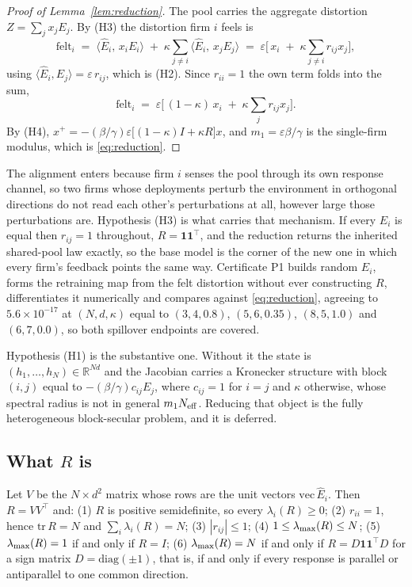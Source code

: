 \begin{proof}[Proof of Lemma~\ref{lem:reduction}]
The pool carries the aggregate distortion $Z = \sum_j x_j E_j$. By (H3) the distortion firm $i$ feels is
\[
  \mathrm{felt}_i \;=\; \langle \hat{E}_i,\, x_i E_i\rangle \;+\; \kappa \sum_{j \neq i} \langle \hat{E}_i,\, x_j E_j\rangle
  \;=\; \varepsilon\Big[\, x_i \;+\; \kappa \sum_{j\neq i} r_{ij} x_j \Big],
\]
using $\langle \hat{E}_i, E_j\rangle = \varepsilon\, r_{ij}$, which is (H2). Since $r_{ii}=1$ the own term folds into the sum,
\[
  \mathrm{felt}_i \;=\; \varepsilon\Big[\,(1-\kappa)\, x_i \;+\; \kappa \sum_j r_{ij} x_j \Big].
\]
By (H4), $x^{+} = -(\beta/\gamma)\varepsilon\big[(1-\kappa)I + \kappa R\big]x$, and $m_1 = \varepsilon\beta/\gamma$ is the single-firm modulus, which is \eqref{eq:reduction}.
\end{proof}

The alignment enters because firm $i$ senses the pool through its own response channel, so two firms whose deployments perturb the environment in orthogonal directions do not read each other's perturbations at all, however large those perturbations are. Hypothesis (H3) is what carries that mechanism. If every $E_i$ is equal then $r_{ij}=1$ throughout, $R = \mathbf{1}\mathbf{1}^{\top}$, and the reduction returns the inherited shared-pool law exactly, so the base model is the corner of the new one in which every firm's feedback points the same way. Certificate P1 builds random $E_i$, forms the retraining map from the felt distortion without ever constructing $R$, differentiates it numerically and compares against \eqref{eq:reduction}, agreeing to $5.6\times 10^{-17}$ at $(N,d,\kappa)$ equal to $(3,4,0.8)$, $(5,6,0.35)$, $(8,5,1.0)$ and $(6,7,0.0)$, so both spillover endpoints are covered.

Hypothesis (H1) is the substantive one. Without it the state is $(h_1,\ldots,h_N) \in \mathbb{R}^{Nd}$ and the Jacobian carries a Kronecker structure with block $(i,j)$ equal to $-(\beta/\gamma)c_{ij}E_j$, where $c_{ij}=1$ for $i=j$ and $\kappa$ otherwise, whose spectral radius is not in general $m_1 N_{\mathrm{eff}}$. Reducing that object is the fully heterogeneous block-secular problem, and it is deferred.

\subsection{What \texorpdfstring{$R$}{R} is}

\begin{alemma}
\label{alem:Rprops}
Let $V$ be the $N \times d^2$ matrix whose rows are the unit vectors $\mathrm{vec}\,\hat{E}_i$. Then $R = VV^{\top}$ and:
(1) $R$ is positive semidefinite, so every $\lambda_i(R)\geq 0$;
(2) $r_{ii}=1$, hence $\mathrm{tr}\,R = N$ and $\sum_i \lambda_i(R) = N$;
(3) $|r_{ij}|\leq 1$;
(4) $1 \leq \lambda_{\max}(R) \leq N$;
(5) $\lambda_{\max}(R)=1$ if and only if $R=I$;
(6) $\lambda_{\max}(R)=N$ if and only if $R = D\mathbf{1}\mathbf{1}^{\top}D$ for a sign matrix $D=\mathrm{diag}(\pm 1)$, that is, if and only if every response is parallel or antiparallel to one common direction.
\end{alemma}

